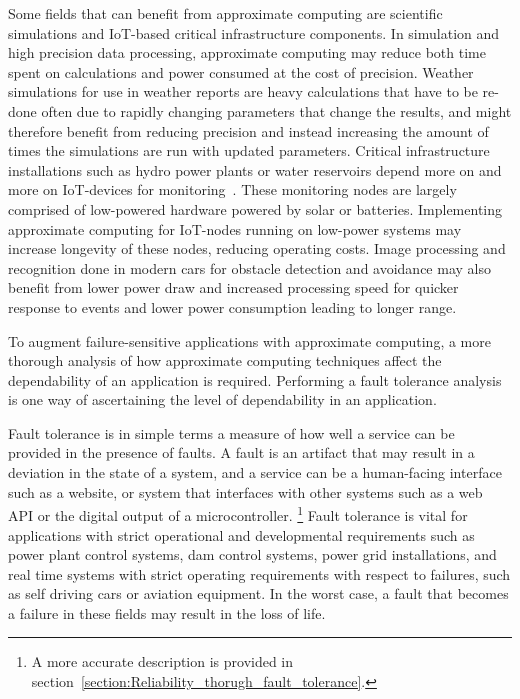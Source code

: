 Some fields that can benefit from approximate computing are scientific simulations and IoT-based critical infrastructure components. In simulation and high precision data processing, approximate computing may reduce both time spent on calculations and power consumed at the cost of precision. Weather simulations for use in weather reports are heavy calculations that have to be re-done often due to rapidly changing parameters that change the results, and might therefore benefit from reducing precision and instead increasing the amount of times the simulations are run with updated parameters. Critical infrastructure installations such as hydro power plants or water reservoirs depend more on and more on IoT-devices for monitoring~\citep{watertight_jaatun}. These monitoring nodes are largely comprised of low-powered hardware powered by solar or batteries. Implementing approximate computing for IoT-nodes running on low-power systems may increase longevity of these nodes, reducing operating costs. Image processing and recognition done in modern cars for obstacle detection and avoidance may also benefit from lower power draw and increased processing speed for quicker response to events and lower power consumption leading to longer range. %

To augment failure-sensitive applications with approximate computing, a more thorough analysis of how approximate computing techniques affect the dependability of an application is required. Performing a fault tolerance analysis is one way of ascertaining the level of dependability in an application.

Fault tolerance is in simple terms a measure of how well a service can be provided in the presence of faults. A fault is an artifact that may result in a deviation in the state of a system, and a service can be a human-facing interface such as a website, or system that interfaces with other systems such as a web API or the digital output of a microcontroller. \footnote{A more accurate description is provided in section~\ref{section:Reliability_thorugh_fault_tolerance}.} Fault tolerance is vital for applications with strict operational and developmental requirements such as power plant control systems, dam control systems, power grid installations, and real time systems with strict operating requirements with respect to failures, such as self driving cars or aviation equipment. In the worst case, a fault that becomes a failure in these fields may result in the loss of life. 



